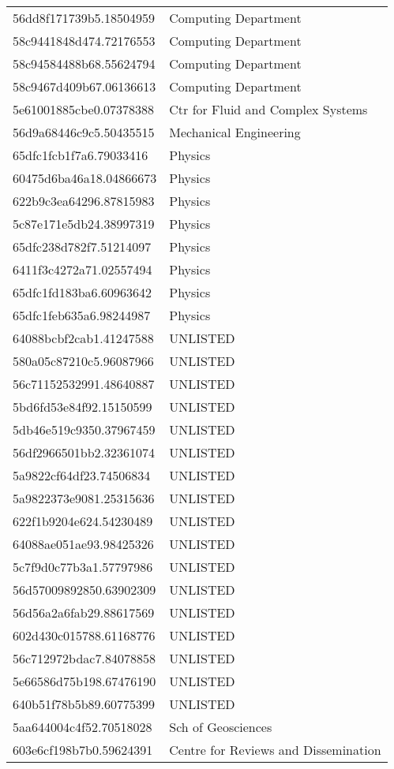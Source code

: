 \begin{tabular}{ll}
56dd8f171739b5.18504959 & Computing Department \\
58c9441848d474.72176553 & Computing Department \\
58c94584488b68.55624794 & Computing Department \\
58c9467d409b67.06136613 & Computing Department \\
5e61001885cbe0.07378388 & Ctr for Fluid and Complex Systems \\
56d9a68446c9c5.50435515 & Mechanical Engineering \\
65dfc1fcb1f7a6.79033416 & Physics \\
60475d6ba46a18.04866673 & Physics \\
622b9c3ea64296.87815983 & Physics \\
5c87e171e5db24.38997319 & Physics \\
65dfc238d782f7.51214097 & Physics \\
6411f3c4272a71.02557494 & Physics \\
65dfc1fd183ba6.60963642 & Physics \\
65dfc1feb635a6.98244987 & Physics \\
64088bcbf2cab1.41247588 & UNLISTED \\
580a05c87210c5.96087966 & UNLISTED \\
56c71152532991.48640887 & UNLISTED \\
5bd6fd53e84f92.15150599 & UNLISTED \\
5db46e519c9350.37967459 & UNLISTED \\
56df2966501bb2.32361074 & UNLISTED \\
5a9822cf64df23.74506834 & UNLISTED \\
5a9822373e9081.25315636 & UNLISTED \\
622f1b9204e624.54230489 & UNLISTED \\
64088ae051ae93.98425326 & UNLISTED \\
5c7f9d0c77b3a1.57797986 & UNLISTED \\
56d57009892850.63902309 & UNLISTED \\
56d56a2a6fab29.88617569 & UNLISTED \\
602d430c015788.61168776 & UNLISTED \\
56c712972bdac7.84078858 & UNLISTED \\
5e66586d75b198.67476190 & UNLISTED \\
640b51f78b5b89.60775399 & UNLISTED \\
5aa644004c4f52.70518028 & Sch of Geosciences \\
603e6cf198b7b0.59624391 & Centre for Reviews and Dissemination \\

\end{tabular}
